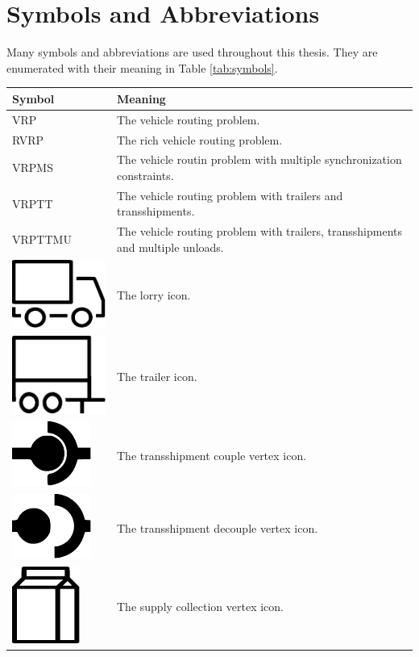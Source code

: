 \section{Symbols and Abbreviations}


Many symbols and abbreviations are used throughout this thesis.
They are enumerated with their meaning in Table \ref{tab:symbols}.

\setlength\LTleft{-1.1in}
\setlength\LTright{-2in}
\begin{longtable}{ll}

\toprule
Symbol       & Meaning       \\ \midrule \endhead
VRP & The vehicle routing problem. \\
RVRP & The rich vehicle routing problem. \\
VRPMS & The vehicle routin problem with multiple synchronization constraints. \\
VRPTT & The vehicle routing problem with trailers and transshipments. \\
VRPTTMU & The vehicle routing problem with trailers, transshipments and multiple unloads. \\
\includegraphics[width=.04\textwidth]{img/lorry_icon.pdf} & The  lorry icon. \\
\includegraphics[width=.04\textwidth]{img/trailer_icon.pdf} & The trailer icon. \\
\includegraphics[width=.04\textwidth]{img/couple_vertex.pdf} & The transshipment couple vertex icon. \\
\includegraphics[width=.04\textwidth]{img/decouple_vertex.pdf} & The transshipment decouple vertex icon. \\
\includegraphics[width=.04\textwidth]{img/supply_vertex.pdf} & The  supply collection vertex icon.\\

\end{longtable}
